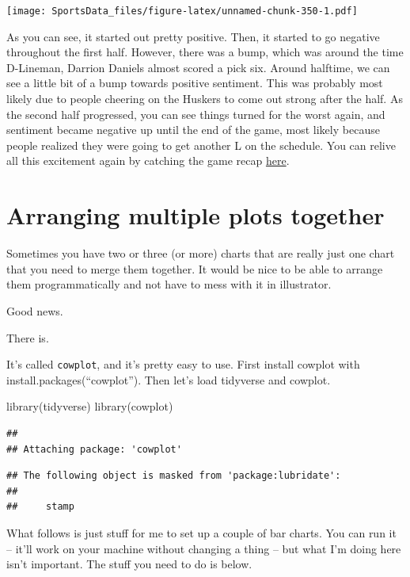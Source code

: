\documentclass[
]{book}
\newenvironment{Shaded}{\begin{snugshade}}{\end{snugshade}}
\newcommand{\FunctionTok}[1]{\textcolor[rgb]{0.00,0.00,0.00}{#1}}
\newcommand{\NormalTok}[1]{#1}
\begin{document}
\texttt{[image: SportsData\_files/figure-latex/unnamed-chunk-350-1.pdf]}

As you can see, it started out pretty positive. Then, it started to go negative throughout the first half. However, there was a bump, which was around the time D-Lineman, Darrion Daniels almost scored a pick six. Around halftime, we can see a little bit of a bump towards positive sentiment. This was probably most likely due to people cheering on the Huskers to come out strong after the half. As the second half progressed, you can see things turned for the worst again, and sentiment became negative up until the end of the game, most likely because people realized they were going to get another L on the schedule. You can relive all this excitement again by catching the game recap \href{https://www.youtube.com/watch?v=m0hKH6Zb0vY\&feature=onebox}{here}.

\hypertarget{arranging-multiple-plots-together}{%
\chapter{Arranging multiple plots together}\label{arranging-multiple-plots-together}}

Sometimes you have two or three (or more) charts that are really just one chart that you need to merge them together. It would be nice to be able to arrange them programmatically and not have to mess with it in illustrator.

Good news.

There is.

It's called \texttt{cowplot}, and it's pretty easy to use. First install cowplot with install.packages(``cowplot''). Then let's load tidyverse and cowplot.

\begin{Shaded}
\begin{Highlighting}[]
\FunctionTok{library}\NormalTok{(tidyverse)}
\FunctionTok{library}\NormalTok{(cowplot)}
\end{Highlighting}
\end{Shaded}

\begin{verbatim}
## 
## Attaching package: 'cowplot'
\end{verbatim}

\begin{verbatim}
## The following object is masked from 'package:lubridate':
## 
##     stamp
\end{verbatim}

What follows is just stuff for me to set up a couple of bar charts. You can run it -- it'll work on your machine without changing a thing -- but what I'm doing here isn't important. The stuff you need to do is below.
\end{document}
